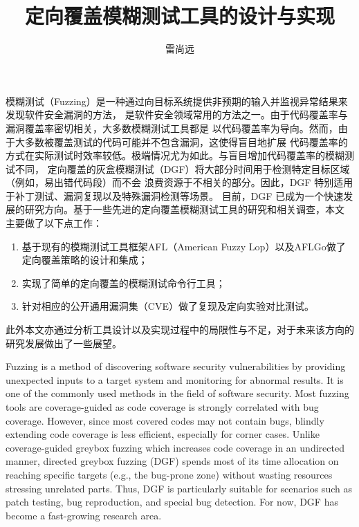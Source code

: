 \documentclass[bachelor]{njupthesis}
\title{定向覆盖模糊测试工具的设计与实现}
\author{雷尚远}
\begin{document}
\makecover

\begin{chineseabstract}
模糊测试（Fuzzing）是一种通过向目标系统提供非预期的输入并监视异常结果来发现软件安全漏洞的方法，
是软件安全领域常用的方法之一。由于代码覆盖率与漏洞覆盖率密切相关，大多数模糊测试工具都是
以代码覆盖率为导向。然而，由于大多数被覆盖测试的代码可能并不包含漏洞，这使得盲目地扩展
代码覆盖率的方式在实际测试时效率较低。极端情况尤为如此。与盲目增加代码覆盖率的模糊测试不同，
定向覆盖的灰盒模糊测试（DGF）将大部分时间用于检测特定目标区域（例如，易出错代码段）而不会
浪费资源于不相关的部分。因此，DGF 特别适用于补丁测试、漏洞复现以及特殊漏洞检测等场景。
目前，DGF 已成为一个快速发展的研究方向。基于一些先进的定向覆盖模糊测试工具的研究和相关调查，本文
主要做了以下点工作：
\begin{enumerate}[label=(\arabic*)]
	\item 基于现有的模糊测试工具框架AFL（American Fuzzy Lop）以及AFLGo做了定向覆盖策略的设计和集成；
	\item 实现了简单的定向覆盖的模糊测试命令行工具；
	\item 针对相应的公开通用漏洞集（CVE）做了复现及定向实验对比测试。
\end{enumerate}
此外本文亦通过分析工具设计以及实现过程中的局限性与不足，对于未来该方向的研究发展做出了一些展望。

\end{chineseabstract}

\begin{englishabstract}
Fuzzing is a method of discovering software security vulnerabilities by providing 
unexpected inputs to a target system and monitoring for abnormal results. It is one of the 
commonly used methods in the field of software security. Most fuzzing tools are 
coverage-guided as code coverage is strongly correlated with bug coverage. However, since most
covered codes may not contain bugs, blindly extending code coverage is less efficient, 
especially for corner cases. Unlike coverage-guided greybox fuzzing which increases code  
coverage in an undirected manner, directed greybox fuzzing (DGF) spends most of its  
time allocation on reaching specific targets (e.g., the bug-prone zone) without wasting 
resources stressing unrelated parts. Thus, DGF is particularly suitable for scenarios such as 
patch testing, bug reproduction, and special bug detection. For now, DGF has become a 
fast-growing research area.

\end{englishabstract}
\end{document}
